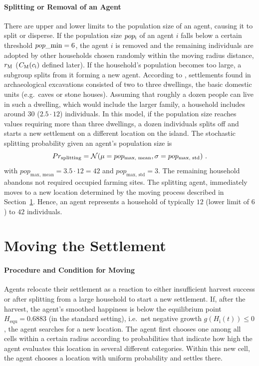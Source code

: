 \paragraph{Splitting or Removal of an Agent}
There are upper and lower limits to the population size of an agent, causing it to split or disperse.
If the population size $pop_{\rm i}$ of an agent $i$ falls below a certain threshold $pop\_{\rm min} = 6$, the agent $i$ is removed and the remaining individuals are adopted by other households chosen randomly within the moving radius distance, $r_{\rm M}$ ($C_{\rm M}(c_{\rm i})$ defined later).
If the household's population becomes too large, a subgroup splits from it forming a new agent.
According to \citet{Bahn2017}, settlements found in archaeological excavations consisted of two to three dwellings, the basic domestic units (e.g.\ caves or stone houses). 
Assuming that roughly a dozen people can live in such a dwelling, which would include the larger family, a household includes around $30$ ($2.5\cdot 12$) individuals.
In this model, if the population size reaches values requiring more than three dwellings, a dozen individuals splits off and starts a new settlement on a different location on the island. 
The stochastic splitting probability given an agent's population size is
\begin{equation}
Pr_{\rm splitting} = \mathcal{N}( \mu = pop_\text{max, mean}, \sigma = pop_\text{max, std})\ .
\end{equation}
with $pop_\text{max, mean} = 3.5 \cdot 12 = 42$ and $pop_\text{max, std} = 3$.
The remaining household abandons not required occupied farming sites.
The splitting agent, immediately moves to a new location determined by the moving process described in Section~\ref{sec:Moving}.
Hence, an agent represents a household of typically $12$ (lower limit of $6$) to $42$ individuals. %

\FloatBarrier
\section{Moving the Settlement}\label{sec:Moving}
\paragraph{Procedure and Condition for Moving}
Agents relocate their settlement as a reaction to either insufficient harvest success or after splitting from a large household to start a new settlement.
If, after the harvest, the agent's smoothed happiness is below the equilibrium point $H_\text{equ}=0.6883$ (in the standard setting), i.e.\ net negative growth $g(H_\text{i}(t))\leq 0$, the agent searches for a new location.
The agent first chooses one among all cells within a certain radius according to probabilities that indicate how high the agent evaluates this location in several different categories.
Within this new cell, the agent chooses a location with uniform probability and settles there.

